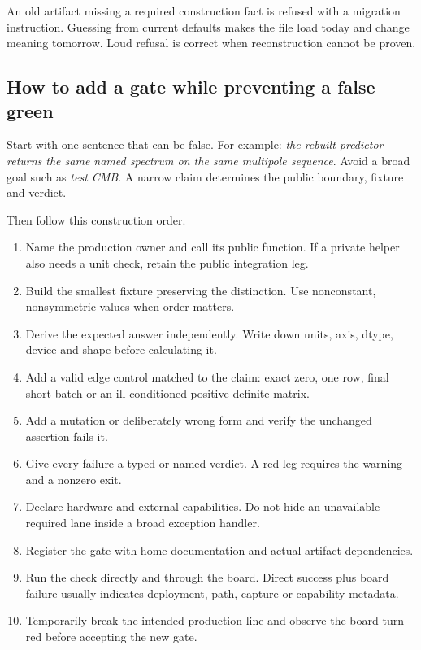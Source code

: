 \documentclass[10pt,aps,prd,twocolumn,nofootinbib]{revtex4-2}
\begin{document}
An old artifact missing a required construction fact is refused with a
migration instruction.  Guessing from current defaults makes the file load
today and change meaning tomorrow.  Loud refusal is correct when
reconstruction cannot be proven.

\subsection{How to add a gate while preventing a false green}

Start with one sentence that can be false.  For example:
\emph{the rebuilt predictor returns the same named spectrum on the same
multipole sequence}.  Avoid a broad goal such as \emph{test CMB}.  A narrow
claim determines the public boundary, fixture and verdict.

Then follow this construction order.
\begin{enumerate}
  \item Name the production owner and call its public function.  If a private
        helper also needs a unit check, retain the public integration leg.
  \item Build the smallest fixture preserving the distinction.  Use
        nonconstant, nonsymmetric values when order matters.
  \item Derive the expected answer independently.  Write down units, axis,
        dtype, device and shape before calculating it.
  \item Add a valid edge control matched to the claim: exact zero, one row,
        final short batch or an ill-conditioned positive-definite matrix.
  \item Add a mutation or deliberately wrong form and verify the unchanged
        assertion fails it.
  \item Give every failure a typed or named verdict.  A red leg requires the
        warning and a nonzero exit.
  \item Declare hardware and external capabilities.  Do not hide an
        unavailable required lane inside a broad exception handler.
  \item Register the gate with home documentation and actual artifact
        dependencies.
  \item Run the check directly and through the board.  Direct success plus
        board failure usually indicates deployment, path, capture or
        capability metadata.
  \item Temporarily break the intended production line and observe the board
        turn red before accepting the new gate.
\end{enumerate}
\end{document}
